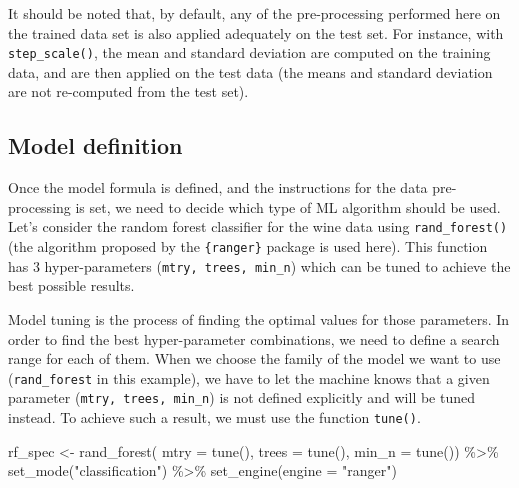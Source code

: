 \documentclass[
]{krantz}
\makeatletter
\newenvironment{Shaded}{\begin{snugshade}}{\end{snugshade}}
\newcommand{\AttributeTok}[1]{\textcolor[rgb]{0.61,0.61,0.61}{#1}}
\newcommand{\FunctionTok}[1]{\textcolor[rgb]{0,0,0}{#1}}
\newcommand{\NormalTok}[1]{#1}
\newcommand{\OtherTok}[1]{\textcolor[rgb]{0.37,0.37,0.37}{#1}}
\newcommand{\SpecialCharTok}[1]{\textcolor[rgb]{0,0,0}{#1}}
\newcommand{\StringTok}[1]{\textcolor[rgb]{0.5,0.5,0.5}{#1}}
\renewenvironment{quote}{\begin{VF}}{\end{VF}}
\newenvironment{kframe}{%
\medskip{}
\setlength{\fboxsep}{.8em}
 \def\at@end@of@kframe{}%
 \ifinner\ifhmode%
  \def\at@end@of@kframe{\end{minipage}}%
  \begin{minipage}{\columnwidth}%
 \fi\fi%
 \def\FrameCommand##1{\hskip\@totalleftmargin \hskip-\fboxsep
 \colorbox{shadecolor}{##1}\hskip-\fboxsep
     \hskip-\linewidth \hskip-\@totalleftmargin \hskip\columnwidth}%
 \MakeFramed {\advance\hsize-\width
   \@totalleftmargin\z@ \linewidth\hsize
   \@setminipage}}%
 {\par\unskip\endMakeFramed%
 \at@end@of@kframe}
\renewenvironment{Shaded}{\begin{kframe}}{\end{kframe}}
\makeatother
\begin{document}
\begin{quote}
It should be noted that, by default, any of the pre-processing performed here on the trained data set is also applied adequately on the test set. For instance, with \texttt{step\_scale()}, the mean and standard deviation are computed on the training data, and are then applied on the test data (the means and standard deviation are not re-computed from the test set).
\end{quote}

\hypertarget{model-definition}{%
\subsection{Model definition}\label{model-definition}}

Once the model formula is defined, and the instructions for the data pre-processing is set, we need to decide which type of ML algorithm should be used. Let's consider the random forest classifier for the wine data using \texttt{rand\_forest()} (the algorithm proposed by the \texttt{\{ranger\}} package is used here). This function has 3 hyper-parameters (\texttt{mtry,\ trees,\ min\_n}) which can be tuned to achieve the best possible results.

Model tuning is the process of finding the optimal values for those parameters. In order to find the best hyper-parameter combinations, we need to define a search range for each of them. When we choose the family of the model we want to use (\texttt{rand\_forest} in this example), we have to let the machine knows that a given parameter (\texttt{mtry,\ trees,\ min\_n}) is not defined explicitly and will be tuned instead. To achieve such a result, we must use the function \texttt{tune()}.

\begin{Shaded}
\begin{Highlighting}[]
\NormalTok{rf\_spec }\OtherTok{\textless{}{-}} \FunctionTok{rand\_forest}\NormalTok{(}
  \AttributeTok{mtry =} \FunctionTok{tune}\NormalTok{(),}
  \AttributeTok{trees =} \FunctionTok{tune}\NormalTok{(),}
  \AttributeTok{min\_n =} \FunctionTok{tune}\NormalTok{()) }\SpecialCharTok{\%\textgreater{}\%}
  \FunctionTok{set\_mode}\NormalTok{(}\StringTok{"classification"}\NormalTok{) }\SpecialCharTok{\%\textgreater{}\%} 
  \FunctionTok{set\_engine}\NormalTok{(}\AttributeTok{engine =} \StringTok{"ranger"}\NormalTok{)}
\end{Highlighting}
\end{Shaded}
\end{document}
